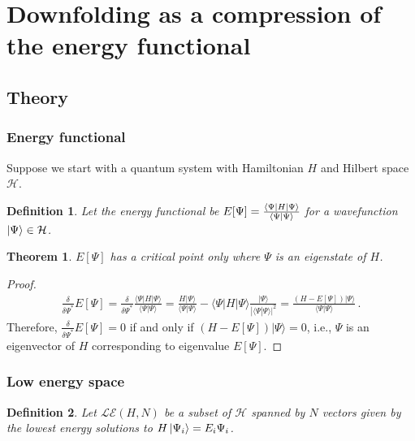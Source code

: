 \newtheorem{theorem}{Theorem}
\newtheorem{definition}{Definition}
\newtheorem{lemma}{Lemma}


\section{Downfolding as a compression of the energy functional}
\label{sec:theory}
\subsection{Theory} 

\subsubsection{Energy functional}
Suppose we start with a quantum system with Hamiltonian $H$ and Hilbert space ${\mathcal H}$.

\begin{definition}
Let the energy functional be $E[\Psi] = \frac{\bra{\Psi}H\ket{\Psi}}{\braket{\Psi|\Psi}}$ for a wavefunction $\ket{\Psi} \in {\mathcal H}$.
\end{definition}


\begin{theorem}
\label{theorem:criticalpoint}
$E[\Psi]$ has a critical point only where $\Psi$ is an eigenstate of $H$.
\end{theorem}
\begin{proof}
\begin{eqnarray}
\frac{\delta }{\delta \Psi^*}  E[\Psi] = \frac{\delta}{\delta \Psi^*}\frac{\langle \Psi |H|\Psi\rangle}{\langle \Psi |\Psi\rangle} = \frac{H|\Psi\rangle}{\langle \Psi |\Psi\rangle} - \langle \Psi |H|\Psi\rangle \frac{|\Psi \rangle}{|\langle \Psi | \Psi\rangle|^2} =\frac{ (H-E[\Psi])|\Psi\rangle }{\langle\Psi|\Psi\rangle}\,.
\end{eqnarray}
Therefore, 
$\frac{\delta }{\delta \Psi^*}  E[\Psi] = 0$ if and only if $(H-E[\Psi])|\Psi\rangle =0$, i.e., $\Psi$ is an eigenvector of $H$ corresponding to eigenvalue $E[\Psi]$.  
\end{proof}

\subsubsection{Low energy space} 

\begin{definition}
Let $\mathcal{LE}(H,N)$ be a subset of ${\mathcal H}$ spanned by $N$ vectors given by the lowest energy solutions to $H\ket{\Psi_i}=E_i{\Psi_i}$. 
\end{definition}

